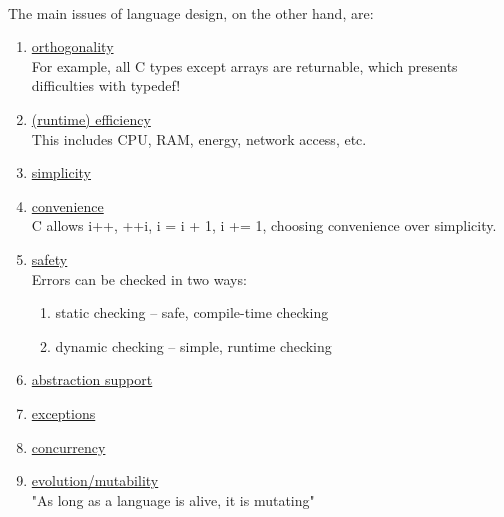 \documentclass[../../lecture_notes.tex]{subfiles}
\begin{document}
\\
The main issues of language design, on the other hand, are: \begin{enumerate}[itemsep=0mm]
	\item \underline{orthogonality}\\
		For example, all C types except arrays are returnable, which presents difficulties with typedef!
	\item \underline{(runtime) efficiency}\\
		This includes CPU, RAM, energy, network access, etc.
	\item \underline{simplicity}
	\item \underline{convenience}\\
		C allows {i++, ++i, i = i + 1, i += 1}, choosing convenience over simplicity.
	\item \underline{safety}\\
		Errors can be checked in two ways:\begin{enumerate}[itemsep=0mm]
			\item static checking -- safe, compile-time checking
			\item dynamic checking -- simple, runtime checking
		\end{enumerate}
	\item \underline{abstraction support}
	\item \underline{exceptions}
	\item \underline{concurrency}
	\item \underline{evolution/mutability}\\
		"As long as a language is alive, it is mutating"
\end{enumerate} \medskip
\end{document}

